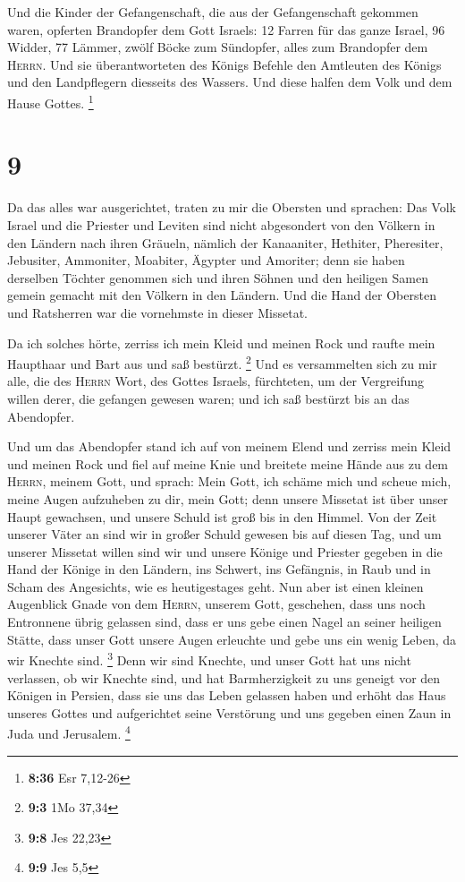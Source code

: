 Und die Kinder der Gefangenschaft, die aus der
Gefangenschaft gekommen waren, opferten Brandopfer dem Gott Israels: 12
Farren für das ganze Israel, 96 Widder, 77 Lämmer, zwölf Böcke zum
Sündopfer, alles zum Brandopfer dem \textsc{Herrn}.  Und
sie überantworteten des Königs Befehle den Amtleuten des Königs und den
Landpflegern diesseits des Wassers. Und diese halfen dem Volk und dem
Hause Gottes. \footnote{\textbf{8:36} Esr 7,12-26}

\hypertarget{section-2}{%
\section{9}\label{section-2}}

 Da das alles war ausgerichtet, traten zu mir die Obersten
und sprachen: Das Volk Israel und die Priester und Leviten sind nicht
abgesondert von den Völkern in den Ländern nach ihren Gräueln, nämlich
der Kanaaniter, Hethiter, Pheresiter, Jebusiter, Ammoniter, Moabiter,
Ägypter und Amoriter;  denn sie haben derselben Töchter
genommen sich und ihren Söhnen und den heiligen Samen gemein gemacht mit
den Völkern in den Ländern. Und die Hand der Obersten und Ratsherren war
die vornehmste in dieser Missetat.

 Da ich solches hörte, zerriss ich mein Kleid und meinen
Rock und raufte mein Haupthaar und Bart aus und saß bestürzt.
\footnote{\textbf{9:3} 1Mo 37,34}  Und es versammelten
sich zu mir alle, die des \textsc{Herrn} Wort, des Gottes Israels,
fürchteten, um der Vergreifung willen derer, die gefangen gewesen waren;
und ich saß bestürzt bis an das Abendopfer.

 Und um das Abendopfer stand ich auf von meinem Elend und
zerriss mein Kleid und meinen Rock und fiel auf meine Knie und breitete
meine Hände aus zu dem \textsc{Herrn}, meinem Gott,  und
sprach: Mein Gott, ich schäme mich und scheue mich, meine Augen
aufzuheben zu dir, mein Gott; denn unsere Missetat ist über unser Haupt
gewachsen, und unsere Schuld ist groß bis in den Himmel. 
Von der Zeit unserer Väter an sind wir in großer Schuld gewesen bis auf
diesen Tag, und um unserer Missetat willen sind wir und unsere Könige
und Priester gegeben in die Hand der Könige in den Ländern, ins Schwert,
ins Gefängnis, in Raub und in Scham des Angesichts, wie es heutigestages
geht.  Nun aber ist einen kleinen Augenblick Gnade von dem
\textsc{Herrn}, unserem Gott, geschehen, dass uns noch Entronnene übrig
gelassen sind, dass er uns gebe einen Nagel an seiner heiligen Stätte,
dass unser Gott unsere Augen erleuchte und gebe uns ein wenig Leben, da
wir Knechte sind. \footnote{\textbf{9:8} Jes 22,23}  Denn
wir sind Knechte, und unser Gott hat uns nicht verlassen, ob wir Knechte
sind, und hat Barmherzigkeit zu uns geneigt vor den Königen in Persien,
dass sie uns das Leben gelassen haben und erhöht das Haus unseres Gottes
und aufgerichtet seine Verstörung und uns gegeben einen Zaun in Juda und
Jerusalem. \footnote{\textbf{9:9} Jes 5,5}

